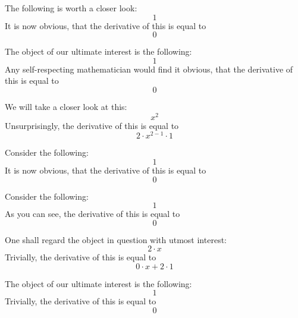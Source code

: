 \documentclass{article}
\begin{document}
The following is worth a closer look:
\begin{equation}
1 
\end{equation}
It is now obvious, that the derivative of this is equal to
\begin{equation}
0 
\end{equation}

The object of our ultimate interest is the following:
\begin{equation}
1 
\end{equation}
Any self-respecting mathematician would find it obvious, that the derivative of this is equal to
\begin{equation}
0 
\end{equation}

We will take a closer look at this:
\begin{equation}
x ^{2 } 
\end{equation}
Unsurprisingly, the derivative of this is equal to
\begin{equation}
2 \cdot x ^{2 - 1 } \cdot 1 
\end{equation}

Consider the following:
\begin{equation}
1 
\end{equation}
It is now obvious, that the derivative of this is equal to
\begin{equation}
0 
\end{equation}

Consider the following:
\begin{equation}
1 
\end{equation}
As you can see, the derivative of this is equal to
\begin{equation}
0 
\end{equation}

One shall regard the object in question with utmost interest:
\begin{equation}
2 \cdot x 
\end{equation}
Trivially, the derivative of this is equal to
\begin{equation}
0 \cdot x + 2 \cdot 1 
\end{equation}

The object of our ultimate interest is the following:
\begin{equation}
1 
\end{equation}
Trivially, the derivative of this is equal to
\begin{equation}
0 
\end{equation}
\end{document}
